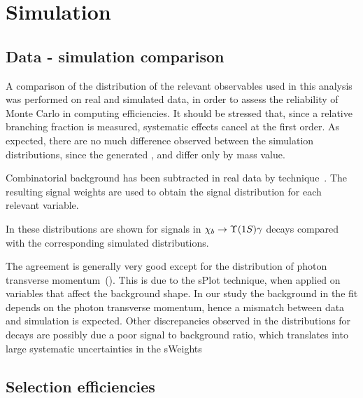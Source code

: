 
\section{Simulation}
\label{sec:mc}

\subsection{Data - simulation comparison}
\label{sec:mc:datavsmc}

A comparison of the distribution of the relevant observables used in this
analysis was performed on real and simulated data, in order to assess the
reliability of Monte Carlo in computing efficiencies. It should be stressed
that, since a relative branching fraction is measured, systematic effects
cancel at the first order. As expected, there are no much difference observed between
the simulation distributions, since the generated \chibOneP, \chibTwoP and
\chibThreeP differ only by \chib mass value.

Combinatorial background has been subtracted in real data by 
\sPlot  technique~\cite{Pivk:2004ty}.
The resulting signal weights are used to obtain the signal distribution for each
relevant variable. 


In 
these distributions  are shown for signals in $\chib \to \Y1S \gamma$ decays
compared with the corresponding simulated distributions.




The agreement is generally very good except for the distribution of photon
transverse momentum~(). This is due to the sPlot
technique, when applied on variables that affect the background shape. In our
study the background in the fit depends on the photon transverse momentum,
hence a mismatch between data and simulation is expected. Other discrepancies
observed in the distributions for \chibThreeP decays are possibly due a poor
signal to background ratio, which translates into large systematic
uncertainties in the sWeights


\subsection{Selection efficiencies}
\label{sec:mc:eff}

